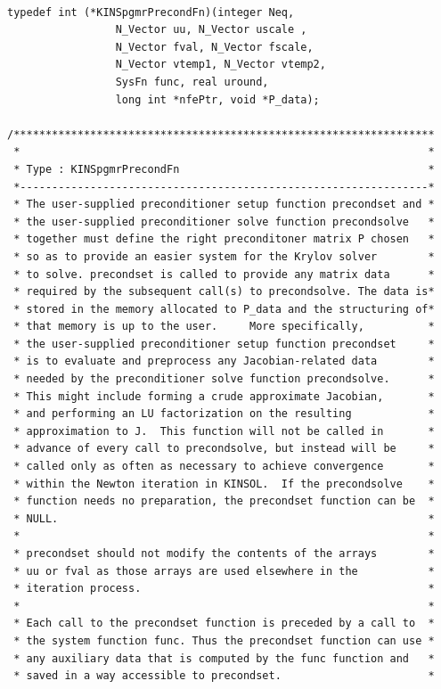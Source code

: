 \documentclass[11pt]{article}
\begin{document}
\small
\begin{verbatim}

typedef int (*KINSpgmrPrecondFn)(integer Neq,
                 N_Vector uu, N_Vector uscale ,
                 N_Vector fval, N_Vector fscale,
                 N_Vector vtemp1, N_Vector vtemp2,
                 SysFn func, real uround,
                 long int *nfePtr, void *P_data);

/******************************************************************
 *                                                                *
 * Type : KINSpgmrPrecondFn                                       *
 *----------------------------------------------------------------*
 * The user-supplied preconditioner setup function precondset and *
 * the user-supplied preconditioner solve function precondsolve   *
 * together must define the right preconditoner matrix P chosen   *
 * so as to provide an easier system for the Krylov solver        *
 * to solve. precondset is called to provide any matrix data      *
 * required by the subsequent call(s) to precondsolve. The data is*
 * stored in the memory allocated to P_data and the structuring of*
 * that memory is up to the user.     More specifically,          *
 * the user-supplied preconditioner setup function precondset     *
 * is to evaluate and preprocess any Jacobian-related data        *
 * needed by the preconditioner solve function precondsolve.      *
 * This might include forming a crude approximate Jacobian,       *
 * and performing an LU factorization on the resulting            *
 * approximation to J.  This function will not be called in       *
 * advance of every call to precondsolve, but instead will be     *
 * called only as often as necessary to achieve convergence       *
 * within the Newton iteration in KINSOL.  If the precondsolve    *
 * function needs no preparation, the precondset function can be  *
 * NULL.                                                          *
 *                                                                *
 * precondset should not modify the contents of the arrays        *
 * uu or fval as those arrays are used elsewhere in the           *
 * iteration process.                                             *
 *                                                                *
 * Each call to the precondset function is preceded by a call to  *
 * the system function func. Thus the precondset function can use *
 * any auxiliary data that is computed by the func function and   *
 * saved in a way accessible to precondset.                       *

\end{verbatim}
\end{document}
